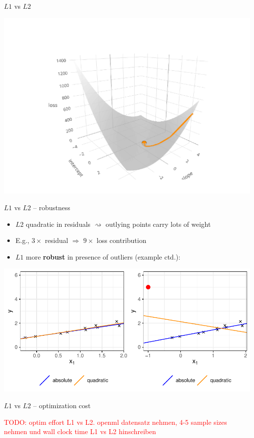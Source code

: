 \documentclass[11pt,compress,t,notes=noshow, xcolor=table]{beamer}
\begin{document}
\begin{vbframe}{$L1$ vs $L2$}
\begin{minipage}[b]{0.34\textwidth}
    \vfill
    
    \includegraphics[width=\textwidth, trim=80 0 100 80, clip]{
    figure/reg_l1_comparison_optim_quad.pdf}
\end{minipage}

\end{vbframe}


\begin{vbframe}{$L1$ vs $L2$ -- robustness}

\begin{itemize}
    \item $L2$ quadratic in residuals $\rightsquigarrow$ outlying points 
    carry lots of weight
    \item E.g., $3 \times$ residual $\Rightarrow$ $9 \times$ loss contribution
    \item $L1$ more \textbf{robust} in presence of outliers (example ctd.):
\end{itemize}

\vfill
\includegraphics[width=\textwidth]{figure/reg_l1_comparison_outlier.pdf}

\end{vbframe}


\begin{vbframe}{$L1$ vs $L2$ -- optimization cost}

\textcolor{red}{TODO: optim effort L1 vs L2. openml datensatz nehmen, 4-5 sample 
sizes nehmen und wall clock time L1 vs L2 hinschreiben}

\end{vbframe}

\endlecture
\end{document}
